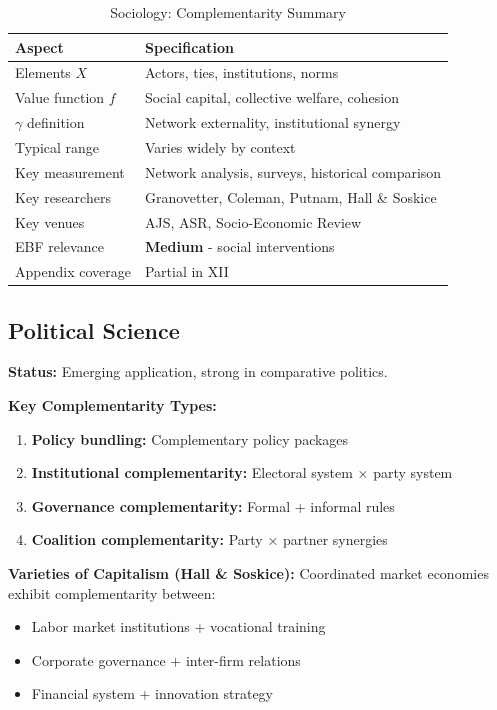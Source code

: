 \begin{table}[h]
\centering
\caption{Sociology: Complementarity Summary}
\label{tab:socio-summary}
\renewcommand{\arraystretch}{1.3}
\small
\begin{tabular}{@{}ll@{}}
\toprule
\textbf{Aspect} & \textbf{Specification} \\
\midrule
Elements $X$ & Actors, ties, institutions, norms \\
Value function $f$ & Social capital, collective welfare, cohesion \\
$\gamma$ definition & Network externality, institutional synergy \\
Typical range & Varies widely by context \\
Key measurement & Network analysis, surveys, historical comparison \\
Key researchers & Granovetter, Coleman, Putnam, Hall \& Soskice \\
Key venues & AJS, ASR, Socio-Economic Review \\
EBF relevance & \textbf{Medium} - social interventions \\
Appendix coverage & Partial in XII \\
\bottomrule
\end{tabular}
\end{table}

\subsection{Political Science}
\label{sec:polsci}

\begin{tcolorbox}[colback=red!5!white,colframe=red!75!black,title=\textbf{Political Science: Policy Complementarities}]

\textbf{Status:} Emerging application, strong in comparative politics.

\textbf{Key Complementarity Types:}
\begin{enumerate}[noitemsep]
    \item \textbf{Policy bundling:} Complementary policy packages
    \item \textbf{Institutional complementarity:} Electoral system × party system
    \item \textbf{Governance complementarity:} Formal + informal rules
    \item \textbf{Coalition complementarity:} Party × partner synergies
\end{enumerate}

\textbf{Varieties of Capitalism (Hall \& Soskice):}
Coordinated market economies exhibit complementarity between:
\begin{itemize}[noitemsep]
    \item Labor market institutions + vocational training
    \item Corporate governance + inter-firm relations
    \item Financial system + innovation strategy
\end{itemize}

\end{tcolorbox}

